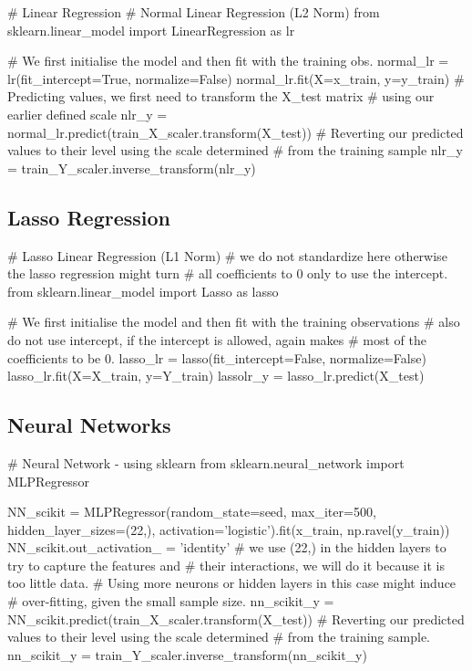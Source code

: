\documentclass[11pt]{article}
\begin{document}
\begin{pyconsole}[][]
# Linear Regression
# Normal Linear Regression (L2 Norm)
from sklearn.linear_model import LinearRegression as lr

# We first initialise the model and then fit with the training obs.
normal_lr = lr(fit_intercept=True, normalize=False)
normal_lr.fit(X=x_train, y=y_train)
# Predicting values, we first need to transform the X_test matrix
# using our earlier defined scale
nlr_y = normal_lr.predict(train_X_scaler.transform(X_test))
# Reverting our predicted values to their level using the scale determined
# from the training sample
nlr_y = train_Y_scaler.inverse_transform(nlr_y)
\end{pyconsole}

\subsection{Lasso Regression}\label{subsec:lasso-regression}
\begin{pyconsole}[][]
# Lasso Linear Regression (L1 Norm)
# we do not standardize here otherwise the lasso regression might turn
# all coefficients to 0 only to use the intercept.
from sklearn.linear_model import Lasso as lasso

# We first initialise the model and then fit with the training observations
# also do not use intercept, if the intercept is allowed, again makes
# most of the coefficients to be 0.
lasso_lr = lasso(fit_intercept=False, normalize=False)
lasso_lr.fit(X=X_train, y=Y_train)
lassolr_y = lasso_lr.predict(X_test)
\end{pyconsole}
\newpage
\subsection{Neural Networks}\label{subsec:neural-networks}

\begin{pyverbatim}[][]
# Neural Network - using sklearn
from sklearn.neural_network import MLPRegressor

NN_scikit = MLPRegressor(random_state=seed,
                         max_iter=500,
                         hidden_layer_sizes=(22,),
                         activation='logistic').fit(x_train,
                                                    np.ravel(y_train))
NN_scikit.out_activation_ = 'identity'
# we use (22,) in the hidden layers to try to capture the features and
# their interactions, we will do it because it is too little data.
# Using more neurons or hidden layers in this case might induce
# over-fitting, given the small sample size.
nn_scikit_y = NN_scikit.predict(train_X_scaler.transform(X_test))
# Reverting our predicted values to their level using the scale determined
# from the training sample.
nn_scikit_y = train_Y_scaler.inverse_transform(nn_scikit_y)
\end{pyverbatim}
\end{document}
